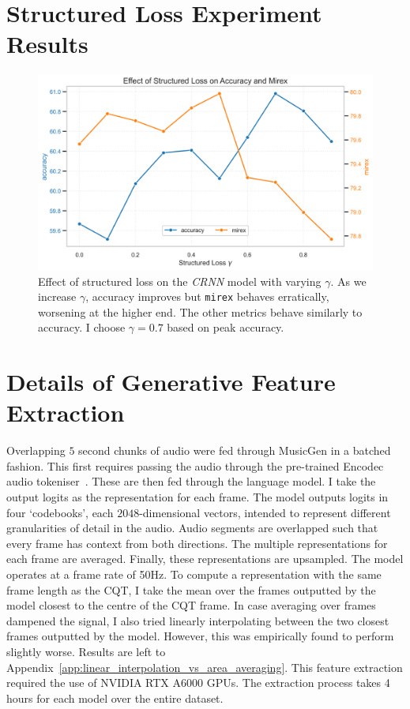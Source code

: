 \section{Structured Loss Experiment Results}\label{app:structured_loss_experiment_results}
\begin{figure}[H]
    \centering
    \includegraphics[width=1.0\textwidth]{figures/structured_loss_accuracy.png}
    \caption{Effect of structured loss on the \emph{CRNN} model with varying $\gamma$. As we increase $\gamma$, accuracy improves but \texttt{mirex} behaves erratically, worsening at the higher end. The other metrics behave similarly to accuracy. I choose $\gamma=0.7$ based on peak accuracy. }\label{fig:structured_loss}
\end{figure}

\section{Details of Generative Feature Extraction}\label{app:generative_feature_extraction}

Overlapping $5$ second chunks of audio were fed through MusicGen in a batched fashion. This first requires passing the audio through the pre-trained Encodec audio tokeniser~\citep{Encodec}. These are then fed through the language model. I take the output logits as the representation for each frame. The model outputs logits in four `codebooks', each $2048$-dimensional vectors, intended to represent different granularities of detail in the audio. Audio segments are overlapped such that every frame has context from both directions. The multiple representations for each frame are averaged. Finally, these representations are upsampled. The model operates at a frame rate of 50Hz. To compute a representation with the same frame length as the CQT, I take the mean over the frames outputted by the model closest to the centre of the CQT frame. In case averaging over frames dampened the signal, I also tried linearly interpolating between the two closest frames outputted by the model. However, this was empirically found to perform slightly worse. Results are left to Appendix~\ref{app:linear_interpolation_vs_area_averaging}. This feature extraction required the use of NVIDIA RTX A6000 GPUs. The extraction process takes 4 hours for each model over the entire dataset.

